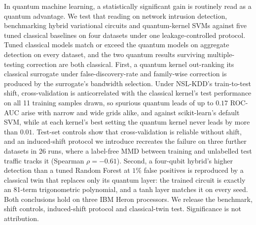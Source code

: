 In quantum machine learning, a statistically significant gain is routinely read as a quantum advantage. We
test that reading on network intrusion detection, benchmarking hybrid variational circuits and
quantum-kernel SVMs against five tuned classical baselines on four datasets under one leakage-controlled
protocol. Tuned classical models match or exceed the quantum models on aggregate detection on every dataset, and the two quantum
results surviving multiple-testing correction are both classical. First, a quantum kernel out-ranking
its classical surrogate under false-discovery-rate and family-wise correction is produced by the
surrogate's bandwidth selection. Under NSL-KDD's train-to-test shift, cross-validation is anticorrelated
with the classical kernel's test performance on all 11 training samples drawn, so spurious quantum leads
of up to $0.17$ ROC-AUC arise with narrow and wide grids alike, and against scikit-learn's default SVM,
while at each kernel's best setting the quantum kernel never leads by more than $0.01$. Test-set controls
show that cross-validation is reliable without shift, and an induced-shift protocol we introduce
recreates the failure on three further datasets in 26 runs, where a label-free MMD between training and
unlabelled test traffic tracks it (Spearman $\rho=-0.61$). Second, a four-qubit hybrid's higher detection
than a tuned Random Forest at $1\%$ false positives is reproduced by a classical twin that replaces only
its quantum layer: the trained circuit is exactly an 81-term trigonometric polynomial, and a tanh layer
matches it on every seed. Both conclusions hold on three IBM Heron processors. We release the benchmark,
shift controls, induced-shift protocol and classical-twin test. Significance is not
attribution.
